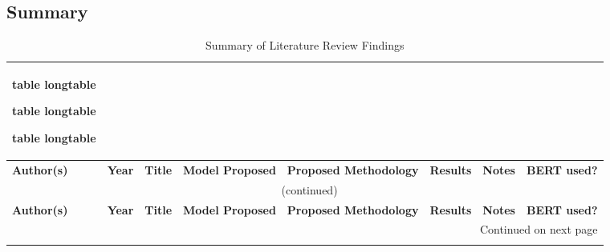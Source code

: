 \documentclass[stu,12pt,floatsintext,donotrepeattitle]{apa7}
\makeatletter
\let\origcaption\caption
\newcommand{\@tabletype}{table}
\newcommand{\@longtabletype}{longtable}
\DeclareRobustCommand{\caption}[2][]{%
    \ifx\relax#1\relax
      \origcaption{#2}%
      \def\temp@cap{#2}%
    \else
      \origcaption[#1]{#2}%
      \def\temp@cap{#1}%
    \fi
    \ifx\@captype\@tabletype
      \ifx\@currenvir\@longtabletype\else
        \addcontentsline{lot}{table}{\protect\numberline{\thetable}{\ignorespaces\temp@cap}}%
      \fi
    \fi
  }%
\let\oldcaption\caption
\renewcommand{\caption}[2][]{%
    \oldcaption[#1]{#2}%
    \vspace{-12pt}%
  }%
\makeatother
\begin{document}
\subsection{Summary}
\begin{landscape}
\pagestyle{empty} %
\begingroup
\tiny
\setlength{\tabcolsep}{3pt}
\renewcommand{\arraystretch}{1.3}
\setlength\LTleft{0pt}
\setlength\LTright{0pt}

\begin{longtable}{@{} p{2cm} p{1cm} p{3.2cm} p{3.2cm} p{4cm} p{2.3cm} p{3.5cm} p{1.2cm} @{}}
\caption{Summary of Literature Review Findings} \label{tab:lit_review_summary} \\
    \toprule
    \textbf{Author(s)} & \textbf{Year} & \textbf{Title} &  \textbf{Model Proposed} & \textbf{Proposed Methodology} & \textbf{Results} & \textbf{Notes} & \textbf{BERT used?} \\
    \midrule
\endfirsthead

\multicolumn{8}{c}{\normalsize\tablename\ \thetable{} (continued)} \\
    \toprule
    \textbf{Author(s)} & \textbf{Year} & \textbf{Title} &  \textbf{Model Proposed} & \textbf{Proposed Methodology} & \textbf{Results} & \textbf{Notes} & \textbf{BERT used?} \\
    \midrule
\endhead

\bottomrule
\multicolumn{8}{r}{{Continued on next page}} \\
\endfoot


\end{longtable}
\end{landscape}
\end{document}

